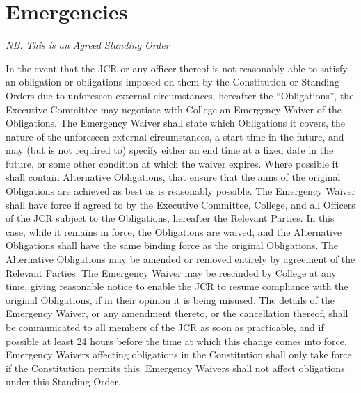 \chapter{Emergencies}
\hspace*{-10pt}\textit{NB: This is an Agreed Standing Order}

\npara In the event that the JCR or any officer thereof is not reasonably able to satisfy an obligation or obligations imposed on them by the Constitution or Standing Orders due to unforeseen external circumstances, hereafter the ``Obligations'', the Executive Committee may negotiate with College an Emergency Waiver of the Obligations.
\npara The Emergency Waiver shall state which Obligations it covers, the nature of the unforeseen external circumstances, a start time in the future, and may (but is not required to) specify either an end time at a fixed date in the future, or some other condition at which the waiver expires. Where possible it shall contain Alternative Obligations, that ensure that the aims of the original Obligations are achieved as best as is reasonably possible.
\npara The Emergency Waiver shall have force if agreed to by the Executive Committee, College, and all Officers of the JCR subject to the Obligations, hereafter the Relevant Parties. In this case, while it remains in force, the Obligations are waived, and the Alternative Obligations shall have the same binding force as the original Obligations.
\npara The Alternative Obligations may be amended or removed entirely by agreement of the Relevant Parties.
\npara The Emergency Waiver may be rescinded by College at any time, giving reasonable notice to enable the JCR to resume compliance with the original Obligations, if in their opinion it is being misused.
\npara The details of the Emergency Waiver, or any amendment thereto, or the cancellation thereof, shall be communicated to all members of the JCR as soon as practicable, and if possible at least 24 hours before the time at which this change comes into force.
\npara Emergency Waivers affecting obligations in the Constitution shall only take force if the Constitution permits this.
\npara Emergency Waivers shall not affect obligations under this Standing Order.